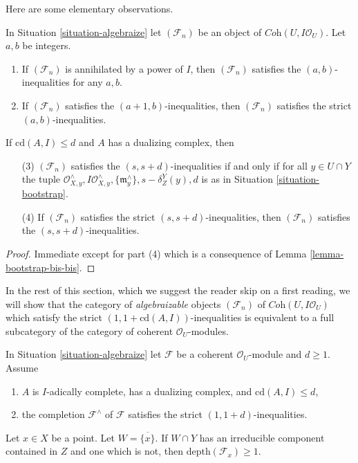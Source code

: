 \noindent
Here are some elementary observations.

\begin{lemma}
\label{lemma-elementary}
In Situation \ref{situation-algebraize} let $(\mathcal{F}_n)$ be an object
of $\textit{Coh}(U, I\mathcal{O}_U)$. Let $a, b$ be integers.
\begin{enumerate}
\item If $(\mathcal{F}_n)$ is annihilated by a power of $I$, then
$(\mathcal{F}_n)$ satisfies the $(a, b)$-inequalities for any $a, b$.
\item If $(\mathcal{F}_n)$ satisfies the $(a + 1, b)$-inequalities, then
$(\mathcal{F}_n)$ satisfies the strict $(a, b)$-inequalities.
\end{enumerate}
If $\text{cd}(A, I) \leq d$ and $A$ has a dualizing complex, then
\begin{enumerate}
\item[(3)] $(\mathcal{F}_n)$ satisfies the $(s, s + d)$-inequalities
if and only if for all $y \in U \cap Y$ the tuple
$\mathcal{O}_{X, y}^\wedge, I\mathcal{O}_{X, y}^\wedge,
\{\mathfrak m_y^\wedge\}, s - \delta^Y_Z(y), d$
is as in Situation \ref{situation-bootstrap}.
\item[(4)]
If $(\mathcal{F}_n)$ satisfies the strict $(s, s + d)$-inequalities, then
$(\mathcal{F}_n)$ satisfies the $(s, s + d)$-inequalities.
\end{enumerate}
\end{lemma}

\begin{proof}
Immediate except for part (4) which is a consequence of
Lemma \ref{lemma-bootstrap-bis-bis}.
\end{proof}

\noindent
In the rest of this section, which we suggest the reader skip on a first
reading, we will show that the category of
{\it algebraizable} objects $(\mathcal{F}_n)$ of
$\textit{Coh}(U, I\mathcal{O}_U)$
which satisfy the strict $(1, 1 + \text{cd}(A, I))$-inequalities
is equivalent to a full subcategory of the category of coherent
$\mathcal{O}_U$-modules.

\begin{lemma}
\label{lemma-sanity}
In Situation \ref{situation-algebraize} let $\mathcal{F}$ be a
coherent $\mathcal{O}_U$-module and $d \geq 1$. Assume
\begin{enumerate}
\item $A$ is $I$-adically complete, has a dualizing complex, and
$\text{cd}(A, I) \leq d$,
\item the completion $\mathcal{F}^\wedge$ of $\mathcal{F}$
satisfies the strict $(1, 1 + d)$-inequalities.
\end{enumerate}
Let $x \in X$ be a point. Let $W = \overline{\{x\}}$.
If $W \cap Y$ has an irreducible component contained in $Z$
and one which is not, then $\text{depth}(\mathcal{F}_x) \geq 1$.
\end{lemma}

